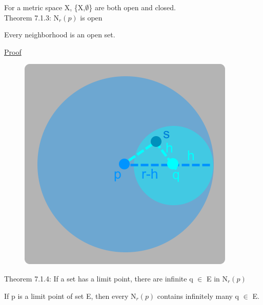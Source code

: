 	\qquad For a metric space X, \{X,$\emptyset$\} are both open and closed. \\

{ \color{red} Theorem 7.1.3: N$_r(p)$ is open } 

	\begin{adjustbox}{minipage=14cm, right, vspace=0.1cm 0cm}
		Every neighborhood is an open set.
	\end{adjustbox}

{ \color{magenta} \underline{Proof} }


\begin{figure}[h]
	\centering
	\includegraphics[scale=0.34]{Images/7.1.3.png}
\end{figure}

\newpage

{ \color{red} Theorem 7.1.4: If a set has a limit point, there are infinite q
$\in$ E in N$_r(p)$ } 
	
	\begin{adjustbox}{minipage=14cm, right, vspace=0.1cm 0cm}
		If p is a limit point of set E, then every N$_r(p)$ contains infinitely many q $\in$ E.
	\end{adjustbox}

